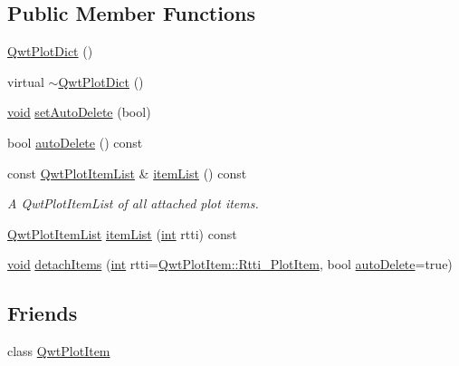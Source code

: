 \subsection*{Public Member Functions}
\begin{DoxyCompactItemize}
\item 
\hyperlink{class_qwt_plot_dict_a0ee364450834ac63f4cbd5baab82d15f}{Qwt\-Plot\-Dict} ()
\item 
virtual \hyperlink{class_qwt_plot_dict_a9199acfe3e8dcb095065bff3f90f518b}{$\sim$\-Qwt\-Plot\-Dict} ()
\item 
\hyperlink{group___u_a_v_objects_plugin_ga444cf2ff3f0ecbe028adce838d373f5c}{void} \hyperlink{class_qwt_plot_dict_a3291431f0a9cca5b2affc5adf17bbdfb}{set\-Auto\-Delete} (bool)
\item 
bool \hyperlink{class_qwt_plot_dict_a10dfae8b454fa4258b0372366013507a}{auto\-Delete} () const 
\item 
const \hyperlink{qwt__plot__dict_8h_a375ca32f3e8a24c8eeb076a637ecd1d8}{Qwt\-Plot\-Item\-List} \& \hyperlink{class_qwt_plot_dict_a9cbb1c5c22de93594b7e2524af108f55}{item\-List} () const 
\begin{DoxyCompactList}\small\item\em A Qwt\-Plot\-Item\-List of all attached plot items. \end{DoxyCompactList}\item 
\hyperlink{qwt__plot__dict_8h_a375ca32f3e8a24c8eeb076a637ecd1d8}{Qwt\-Plot\-Item\-List} \hyperlink{class_qwt_plot_dict_a0979adc53ad5ecf5e4a93aa9b5a4df38}{item\-List} (\hyperlink{ioapi_8h_a787fa3cf048117ba7123753c1e74fcd6}{int} rtti) const 
\item 
\hyperlink{group___u_a_v_objects_plugin_ga444cf2ff3f0ecbe028adce838d373f5c}{void} \hyperlink{class_qwt_plot_dict_acb2e402e05c693433ed7e84696fbdfc0}{detach\-Items} (\hyperlink{ioapi_8h_a787fa3cf048117ba7123753c1e74fcd6}{int} rtti=\hyperlink{class_qwt_plot_item_ab149ac85e233ce9cedf2f2f2af871bf3af1fb53ddb320ecbf2bba00a323cf08ff}{Qwt\-Plot\-Item\-::\-Rtti\-\_\-\-Plot\-Item}, bool \hyperlink{class_qwt_plot_dict_a10dfae8b454fa4258b0372366013507a}{auto\-Delete}=true)
\end{DoxyCompactItemize}
\subsection*{Friends}
\begin{DoxyCompactItemize}
\item 
class \hyperlink{class_qwt_plot_dict_a055bada44394b2c38d0d907087a14fa3}{Qwt\-Plot\-Item}
\end{DoxyCompactItemize}



